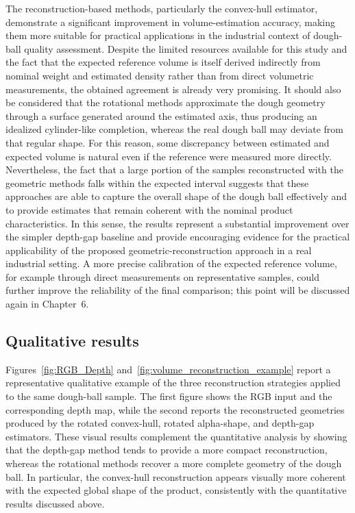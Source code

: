 The reconstruction-based methods, particularly the convex-hull estimator, demonstrate a significant improvement in volume-estimation accuracy, making them more suitable for practical applications in the industrial context of dough-ball quality assessment. Despite the limited resources available for this study and the fact that the expected reference volume is itself derived indirectly from nominal weight and estimated density rather than from direct volumetric measurements, the obtained agreement is already very promising. It should also be considered that the rotational methods approximate the dough geometry through a surface generated around the estimated axis, thus producing an idealized cylinder-like completion, whereas the real dough ball may deviate from that regular shape. For this reason, some discrepancy between estimated and expected volume is natural even if the reference were measured more directly. Nevertheless, the fact that a large portion of the samples reconstructed with the geometric methods falls within the expected interval suggests that these approaches are able to capture the overall shape of the dough ball effectively and to provide estimates that remain coherent with the nominal product characteristics. In this sense, the results represent a substantial improvement over the simpler depth-gap baseline and provide encouraging evidence for the practical applicability of the proposed geometric-reconstruction approach in a real industrial setting. A more precise calibration of the expected reference volume, for example through direct measurements on representative samples, could further improve the reliability of the final comparison; this point will be discussed again in Chapter~6.

\subsection{Qualitative results}
Figures~\ref{fig:RGB_Depth} and~\ref{fig:volume_reconstruction_example} report a representative qualitative example of the three reconstruction strategies applied to the same dough-ball sample. The first figure shows the RGB input and the corresponding depth map, while the second reports the reconstructed geometries produced by the rotated convex-hull, rotated alpha-shape, and depth-gap estimators. These visual results complement the quantitative analysis by showing that the depth-gap method tends to provide a more compact reconstruction, whereas the rotational methods recover a more complete geometry of the dough ball. In particular, the convex-hull reconstruction appears visually more coherent with the expected global shape of the product, consistently with the quantitative results discussed above.

